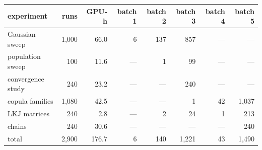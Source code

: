 \footnotesize
\begin{tabular}{lrrrrrrr}
\toprule
experiment & runs & GPU-h & batch 1 & batch 2 & batch 3 & batch 4 & batch 5 \\
\midrule
Gaussian sweep & 1{,}000 & 66.0 & 6 & 137 & 857 & --- & --- \\
population sweep & 100 & 11.6 & --- & 1 & 99 & --- & --- \\
convergence study & 240 & 23.2 & --- & --- & 240 & --- & --- \\
copula families & 1{,}080 & 42.5 & --- & --- & 1 & 42 & 1{,}037 \\
LKJ matrices & 240 & 2.8 & --- & 2 & 24 & 1 & 213 \\
chains & 240 & 30.6 & --- & --- & --- & --- & 240 \\
\midrule
total & 2{,}900 & 176.7 & 6 & 140 & 1{,}221 & 43 & 1{,}490 \\
\bottomrule
\end{tabular}
